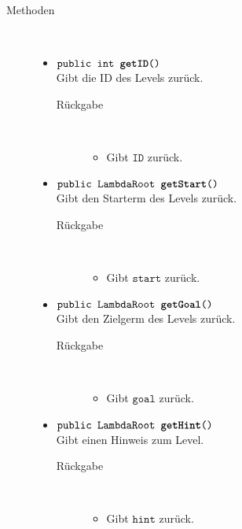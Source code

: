 \begin{description}
\begin{itemize}
	\end{itemize}
	
\item[Methoden] \hfill \\
	\vspace{-.8cm}
	\begin{itemize}
		\item $\texttt{public int \textbf{getID}()}$ \\ Gibt die ID des Levels zurück.
		\begin{description}
			\item[Rückgabe] \hfill \\
			\vspace{-.8cm}
			\begin{itemize}
				\item Gibt $\texttt{ID}$ zurück.
			\end{itemize}
			\end{description}
		
		\item $\texttt{public LambdaRoot \textbf{getStart}()}$ \\ Gibt den Starterm des Levels zurück.
		\begin{description}
			\item[Rückgabe] \hfill \\
			\vspace{-.8cm}
			\begin{itemize}
				\item Gibt $\texttt{start}$ zurück.
			\end{itemize}
			\end{description}
			
		\item $\texttt{public LambdaRoot \textbf{getGoal}()}$ \\ Gibt den Zielgerm des Levels zurück.
		\begin{description}
			\item[Rückgabe] \hfill \\
			\vspace{-.8cm}
			\begin{itemize}
				\item Gibt $\texttt{goal}$ zurück.
			\end{itemize}
			\end{description}
			
		\item $\texttt{public LambdaRoot \textbf{getHint}()}$ \\ Gibt einen Hinweis zum Level.
		\begin{description}
			\item[Rückgabe] \hfill \\
			\vspace{-.8cm}
			\begin{itemize}
				\item Gibt $\texttt{hint}$ zurück.
			\end{itemize}
			\end{description}
			

\end{itemize}
\end{description}
